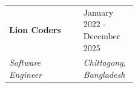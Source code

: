 \documentclass[10pt, letterpaper]{article}
\makeatletter
\newenvironment{highlights}{
    \begin{itemize}[
        topsep=0.10 cm,
        parsep=0.10 cm,
        partopsep=0pt,
        itemsep=0pt,
        leftmargin=0 cm + 10pt
    ]
}{
    \end{itemize}
} %
\newenvironment{onecolentry}{
    \begin{adjustwidth}{
        0 cm + 0.00001 cm
    }{
        0 cm + 0.00001 cm
    }
}{
    \end{adjustwidth}
} %
\newcommand{\experienceEntry}[4]{
    \noindent
    \begin{tabularx}{\linewidth}{@{}X>{\raggedleft\arraybackslash}p{0.42\linewidth}@{}}
        \textbf{#1} & #3 \\
        \textit{#2} & \textit{#4}
    \end{tabularx}
    \par
}
\makeatother
\begin{document}
    \vspace{0.25 cm}
    \experienceEntry{Lion Coders}{Software Engineer}{January 2022 - December 2025}{Chittagong, Bangladesh}
\end{document}
